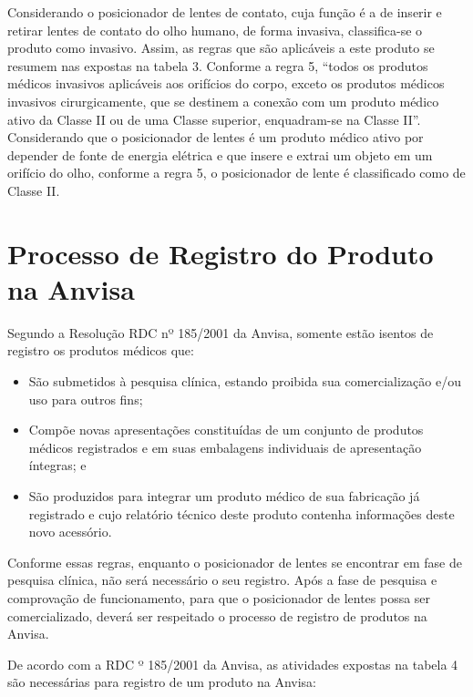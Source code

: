 Considerando o posicionador de lentes de contato, cuja função é a de inserir e retirar lentes de contato do olho humano, de forma invasiva, classifica-se o produto como invasivo. Assim, as regras que são aplicáveis a este produto se resumem nas expostas na tabela 3.  Conforme a regra 5, “todos os produtos médicos invasivos aplicáveis aos orifícios do corpo, exceto os produtos médicos invasivos cirurgicamente, que se destinem a conexão com um produto médico ativo da Classe II ou de uma Classe superior, enquadram-se na Classe II”. Considerando que o posicionador de lentes é um produto médico ativo por depender de fonte de energia elétrica e que insere e extrai um objeto em um orifício do olho, conforme a regra 5, o posicionador de lente é classificado como de Classe II.

\section[Processo de Registro do Produto na Anvisa]{Processo de Registro do Produto na Anvisa}

Segundo a Resolução RDC nº 185/2001 da Anvisa, somente estão isentos de registro os produtos médicos que:
\begin{itemize}
\item São submetidos à pesquisa clínica, estando proibida sua comercialização e/ou uso para outros fins;
\item Compõe novas apresentações constituídas de um conjunto de produtos médicos registrados e em suas embalagens individuais de apresentação íntegras; e
\item São produzidos para integrar um produto médico de sua fabricação já registrado e cujo relatório técnico deste produto contenha informações deste novo acessório.
\end{itemize}

Conforme essas regras, enquanto o posicionador de lentes se encontrar em fase de pesquisa clínica, não será necessário o seu registro. Após a fase de pesquisa e comprovação de funcionamento, para que o posicionador de lentes possa ser comercializado, deverá ser respeitado o processo de registro de produtos na Anvisa.

De acordo com a RDC º 185/2001 da Anvisa, as atividades expostas na tabela 4 são necessárias para registro de um produto na Anvisa:

